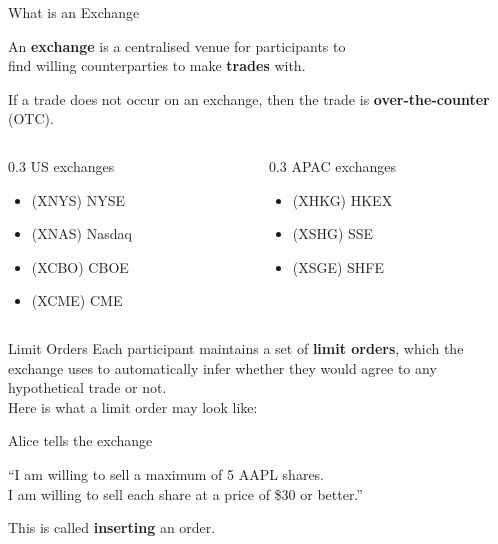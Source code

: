 \begin{frame}{What is an Exchange}
  \begin{sqt:definition}
    An \textbf{exchange} is a centralised venue for participants to\\
    find willing counterparties to make \textbf{trades} with.
  \end{sqt:definition}
  \begin{sqt:definition}
    If a trade does not occur on an exchange, then the trade is \textbf{over-the-counter} (OTC).
  \end{sqt:definition}
  \vspace{0.5cm}

  \begin{center}
    \begin{columns}
      \begin{column}[t]{0.3\textwidth}
        US exchanges
        \begin{itemize}
          \item (XNYS) NYSE
          \item (XNAS) Nasdaq
          \item (XCBO) CBOE
          \item (XCME) CME
        \end{itemize}
      \end{column}

      \begin{column}[t]{0.3\textwidth}
        APAC exchanges
        \begin{itemize}
          \item (XHKG) HKEX
          \item (XSHG) SSE
          \item (XSGE) SHFE
        \end{itemize}
      \end{column}
    \end{columns}
  \end{center}
\end{frame}

\begin{frame}{Limit Orders}
  Each participant maintains a set of \textbf{limit orders}, which the exchange uses 
  to automatically infer whether they would agree to any hypothetical trade or not.\\
  Here is what a limit order may look like:
  \begin{sqt:tip}
    Alice tells the exchange
    \begin{center}
      ``I am willing to sell a maximum of 5 AAPL shares.\\
      I am willing to sell each share at a price of \$30 or better.''
    \end{center}
  \end{sqt:tip}

  This is called \textbf{inserting} an order.

  \begin{center}
    
  \end{center}
\end{frame}

